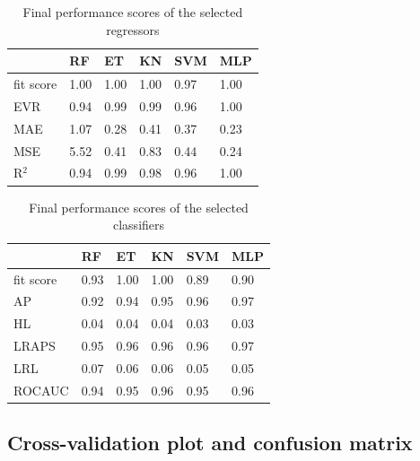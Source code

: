     \begin{table}[ht!]
    	\centering
    	\caption{Final performance scores of the selected regressors}
    	\begin{tabular}{lllll>{\columncolor[gray]{0.9}}l}
    		\hline
    		& \textbf{\gls{RF}}  & \textbf{\gls{ET}}  & \textbf{\gls{KN}} &
    		\textbf{\gls{SVM}}   & \textbf{\gls{MLP}} \\
    		\hline
    		fit score  & 1.00 	& 1.00 & 1.00 & 0.97  & 1.00 \\
    		\gls{EVR} & 0.94 & 0.99 & 0.99 & 0.96 & 1.00 \\
    		\gls{MAE} & 1.07 & 0.28 & 0.41 & 0.37 & 0.23 \\
    		\gls{MSE} & 5.52 & 0.41 & 0.83 & 0.44 & 0.24 \\
    		R$^2$ & 0.94 & 0.99 & 0.98 & 0.96 & 1.00 \\
    		\hline
    	\end{tabular}
    	\label{table:finalreg}
    \end{table}
    \begin{table}[ht!]
    	\centering
    	\caption{Final performance scores of the selected classifiers}
    	\begin{tabular}{lllll>{\columncolor[gray]{0.9}}l}
    		\hline
    		& \textbf{\gls{RF}} & \textbf{\gls{ET}}  & \textbf{\gls{KN}} &
    		\textbf{\gls{SVM}}  & \textbf{\gls{MLP}} \\
    		\hline
    		fit score  & 0.93 & 1.00 & 1.00  & 0.89 & 0.90 \\
    		\gls{AP} & 0.92 & 0.94 & 0.95  & 0.96 & 0.97  \\
    		\gls{HL} & 0.04 & 0.04 & 0.04  & 0.03 & 0.03  \\
    		\gls{LRAPS}  & 0.95 & 0.96 & 0.96  & 0.96 & 0.97 \\
    		\gls{LRL} & 0.07 & 0.06 & 0.06  & 0.05 & 0.05  \\
    		\gls{ROCAUC} & 0.94 & 0.95 & 0.96  & 0.95 & 0.96 \\
    		\hline
    	\end{tabular}
    	\label{table:finalclf}
    \end{table}

\subsection{Cross-validation plot and confusion matrix}

